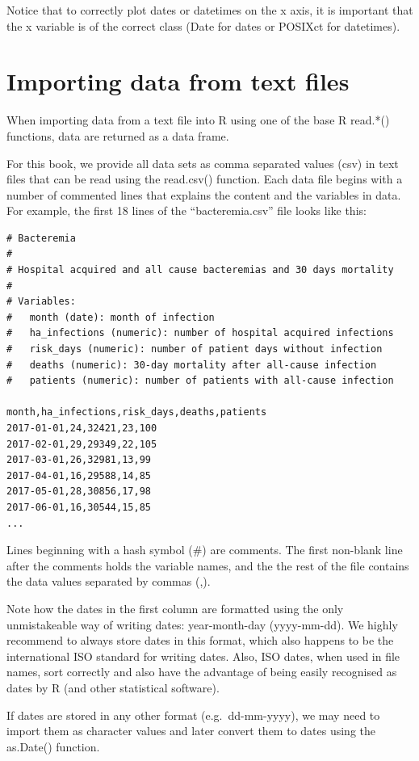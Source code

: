 \documentclass[
]{book}
\begin{document}
Notice that to correctly plot dates or datetimes on the x axis, it is important that the x variable is of the correct class (Date for dates or POSIXct for datetimes).

\section{Importing data from text files}\label{importing-data-from-text-files}

When importing data from a text file into R using one of the base R read.*() functions, data are returned as a data frame.

For this book, we provide all data sets as comma separated values (csv) in text files that can be read using the read.csv() function. Each data file begins with a number of commented lines that explains the content and the variables in data. For example, the first 18 lines of the ``bacteremia.csv'' file looks like this:

\begin{verbatim}
# Bacteremia
# 
# Hospital acquired and all cause bacteremias and 30 days mortality
# 
# Variables:
#   month (date): month of infection
#   ha_infections (numeric): number of hospital acquired infections
#   risk_days (numeric): number of patient days without infection
#   deaths (numeric): 30-day mortality after all-cause infection
#   patients (numeric): number of patients with all-cause infection

month,ha_infections,risk_days,deaths,patients
2017-01-01,24,32421,23,100
2017-02-01,29,29349,22,105
2017-03-01,26,32981,13,99
2017-04-01,16,29588,14,85
2017-05-01,28,30856,17,98
2017-06-01,16,30544,15,85
...
\end{verbatim}

Lines beginning with a hash symbol (\#) are comments. The first non-blank line after the comments holds the variable names, and the the rest of the file contains the data values separated by commas (,).

Note how the dates in the first column are formatted using the only unmistakeable way of writing dates: year-month-day (yyyy-mm-dd). We highly recommend to always store dates in this format, which also happens to be the international ISO standard for writing dates. Also, ISO dates, when used in file names, sort correctly and also have the advantage of being easily recognised as dates by R (and other statistical software).

If dates are stored in any other format (e.g.~dd-mm-yyyy), we may need to import them as character values and later convert them to dates using the as.Date() function.
\end{document}
